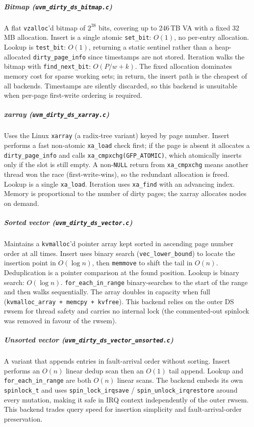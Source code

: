 \subparagraph{Bitmap (\texttt{uvm\_dirty\_ds\_bitmap.c})}
A flat \texttt{vzalloc}'d bitmap of $2^{38}$ bits, covering up to 246\,TB VA
with a fixed 32\,MB allocation.
Insert is a single atomic \texttt{set\_bit}: $O(1)$, no per-entry allocation.
Lookup is \texttt{test\_bit}: $O(1)$, returning a static sentinel rather than
a heap-allocated \texttt{dirty\_page\_info} since timestamps are not stored.
Iteration walks the bitmap with \texttt{find\_next\_bit}: $O(P/w + k)$.
The fixed allocation dominates memory cost for sparse working sets; in return,
the insert path is the cheapest of all backends.
Timestamps are silently discarded, so this backend is unsuitable when
per-page first-write ordering is required.

\subparagraph{xarray (\texttt{uvm\_dirty\_ds\_xarray.c})}
Uses the Linux \texttt{xarray} (a radix-tree variant) keyed by page number.
Insert performs a fast non-atomic \texttt{xa\_load} check first; if the
page is absent it allocates a \texttt{dirty\_page\_info} and calls
\texttt{xa\_cmpxchg(GFP\_ATOMIC)}, which atomically inserts only if the slot
is still empty.
A non-\texttt{NULL} return from \texttt{xa\_cmpxchg} means another thread
won the race (first-write-wins), so the redundant allocation is freed.
Lookup is a single \texttt{xa\_load}.
Iteration uses \texttt{xa\_find} with an advancing index.
Memory is proportional to the number of dirty pages; the xarray allocates
nodes on demand.

\subparagraph{Sorted vector (\texttt{uvm\_dirty\_ds\_vector.c})}
Maintains a \texttt{kvmalloc}'d pointer array kept sorted in ascending page
number order at all times.
Insert uses binary search (\texttt{vec\_lower\_bound}) to locate the insertion
point in $O(\log n)$, then \texttt{memmove} to shift the tail in $O(n)$.
Deduplication is a pointer comparison at the found position.
Lookup is binary search: $O(\log n)$.
\texttt{for\_each\_in\_range} binary-searches to the start of the range and
then walks sequentially.
The array doubles in capacity when full (\texttt{kvmalloc\_array + memcpy +
kvfree}).
This backend relies on the outer DS rwsem for thread safety and carries no
internal lock (the commented-out spinlock was removed in favour of the rwsem).

\subparagraph{Unsorted vector (\texttt{uvm\_dirty\_ds\_vector\_unsorted.c})}
A variant that appends entries in fault-arrival order without sorting.
Insert performs an $O(n)$ linear dedup scan then an $O(1)$ tail append.
Lookup and \texttt{for\_each\_in\_range} are both $O(n)$ linear scans.
The backend embeds its own \texttt{spinlock\_t} and uses
\texttt{spin\_lock\_irqsave} / \texttt{spin\_unlock\_irqrestore} around every
mutation, making it safe in IRQ context independently of the outer rwsem.
This backend trades query speed for insertion simplicity and fault-arrival-order
preservation.

